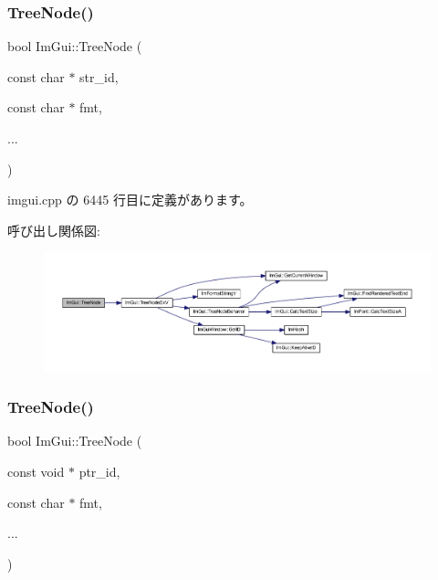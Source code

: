 \subsubsection{\texorpdfstring{Tree\+Node()}{TreeNode()}\hspace{0.1cm}{\footnotesize\ttfamily [2/3]}}
{\footnotesize\ttfamily bool Im\+Gui\+::\+Tree\+Node (\begin{DoxyParamCaption}\item[{const char $\ast$}]{str\+\_\+id,  }\item[{const char $\ast$}]{fmt,  }\item[{}]{... }\end{DoxyParamCaption})}



 imgui.\+cpp の 6445 行目に定義があります。

呼び出し関係図\+:\nopagebreak
\begin{figure}[H]
\begin{center}
\leavevmode
\includegraphics[width=350pt]{namespace_im_gui_a6e6e4de20291002430854cbd8cd58843_cgraph}
\end{center}
\end{figure}
\mbox{\label{namespace_im_gui_a47f1421323f90fdd0a9cbfea2338b10f}} 
\subsubsection{\texorpdfstring{Tree\+Node()}{TreeNode()}\hspace{0.1cm}{\footnotesize\ttfamily [3/3]}}
{\footnotesize\ttfamily bool Im\+Gui\+::\+Tree\+Node (\begin{DoxyParamCaption}\item[{const void $\ast$}]{ptr\+\_\+id,  }\item[{const char $\ast$}]{fmt,  }\item[{}]{... }\end{DoxyParamCaption})}



